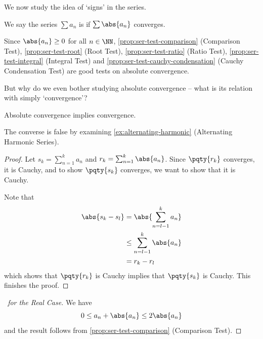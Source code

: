 We now study the idea of `signs' in the series.

\begin{definition}
    \label{def:ser-absolute-convergence}%
    We say the series \(\sum a_n\) is  if \(\sum \abs{a_n}\) converges.
\end{definition}

\begin{remark}
    Since \(\abs{a_n} \geq 0\) for all \(n \in \NN\), \autoref{prop:ser-test-comparison} (Comparison Test), \autoref{prop:ser-test-root} (Root Test), \autoref{prop:ser-test-ratio} (Ratio Test), \autoref{prop:ser-test-integral} (Integral Test) and \autoref{prop:ser-test-cauchy-condensation} (Cauchy Condensation Test) are good tests on absolute convergence.
\end{remark}

But why do we even bother studying absolute convergence -- what is its relation with simply `convergence'?

\begin{theorem}
    \label{thm:ser-absolute-convergence-implies-convergence}%
    Absolute convergence implies convergence.
\end{theorem}

\begin{remark}
    The converse is false by examining \autoref{ex:alternating-harmonic} (Alternating Harmonic Series).
\end{remark}

\begin{proof}
    Let \(s_k = \sum_{n = 1}^{k} a_n\) and \(r_k = \sum_{n = 1}^{k} \abs{a_n}\). Since \(\pqty{r_k}\) converges, it is Cauchy, and to show \(\pqty{s_k}\) converges, we want to show that it is Cauchy.

    Note that
    \begin{align*}
        \abs{s_k - s_l} &= \abs{\sum_{n = l - 1}^{k} a_n} \\
        &\leq \sum_{n = l - 1}^{k} \abs{a_n} \\
        &= r_k - r_l
    \end{align*}
    which shows that \(\pqty{r_k}\) is Cauchy implies that \(\pqty{s_k}\) is Cauchy. This finishes the proof.
\end{proof}

\begin{proof}[\proofname\ for the Real Case]
    We have
    \[
        0 \leq a_n + \abs{a_n} \leq 2 \abs{a_n}
    \]
    and the result follows from \autoref{prop:ser-test-comparison} (Comparison Test).
\end{proof}

